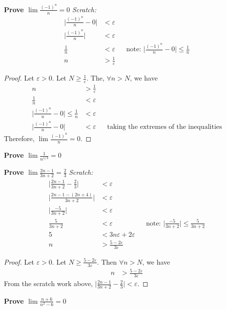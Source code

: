 \documentclass[13pt]{letter}
\begin{document}
\textbf{Prove $\lim \frac{(-1)^n}{n} = 0$}
\textit{Scratch:}
  \begin{align*}
    \bigg| \frac{(-1)^n}{n} - 0 \bigg| &< \varepsilon \\
    \bigg| \frac{(-1)^n}{n} \bigg| &< \varepsilon \\
    \frac{1}{n} &< \varepsilon && \text{note: } \bigg|
                                    \frac{(-1)^n}{n} - 0 \bigg| \leq
                                  \frac{1}{n} \\
    n &> \frac{1}{\varepsilon}
  \end{align*}
\begin{proof}
  Let $\varepsilon > 0$. Let $N \geq \frac{1}{\varepsilon}$. The,
  $\forall n > N$, we have
  \begin{align*}
    n &> \frac{1}{\varepsilon} \\
    \frac{1}{n} &< \varepsilon \\
    \bigg| \frac{(-1)^n}{n} - 0 \bigg| \leq \frac{1}{n} &< \varepsilon \\
    \bigg| \frac{(-1)^n}{n} - 0 \bigg| &< \varepsilon && \text{taking
                                                         the extremes
                                                         of the inequalities}
  \end{align*}
  Therefore, $\lim \frac{(-1)^n}{n} = 0$.
\end{proof}

\textbf{Prove $\lim \frac{1}{n^{1/3}} = 0$}

\textbf{Prove $\lim \frac{2n - 1}{3n + 2} = \frac{2}{3}$}
\textit{Scratch:}
  \begin{align*}
    \bigg| \frac{2n - 1}{3n + 2} - \frac{2}{3} \bigg| &< \varepsilon \\
    \bigg| \frac{2n - 1 - (2n + 4)}{3n + 2} \bigg| &< \varepsilon \\
    \bigg| \frac{-5}{3n + 2} \bigg| &< \varepsilon \\
    \frac{5}{3n + 2} &< \varepsilon && \text{note: } \bigg|
                                       \frac{-5}{3n + 2} \bigg| \leq
                                                                  \frac{5}{3n + 2} \\
    5 &< 3n\varepsilon + 2\varepsilon \\
    n &> \frac{5 - 2\varepsilon}{3\varepsilon}
  \end{align*}
\begin{proof}
  Let $\varepsilon > 0$. Let $N \geq \frac{5 - 2\varepsilon}{3\varepsilon}$. Then
  $\forall n > N$, we have
  \begin{align*}
    n &> \frac{5 - 2\varepsilon}{3\varepsilon}
  \end{align*}
  From the scratch work above, $\bigg| \frac{2n - 1}{3n + 2} - \frac{2}{3} \bigg| < \varepsilon$.
\end{proof}

\textbf{Prove $\lim \frac{n + 6}{n^2 - 6} = 0$}
\end{document}
